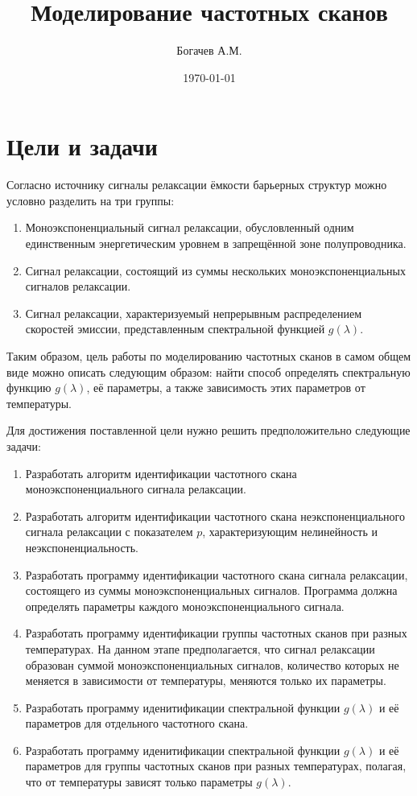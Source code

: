 \documentclass{report}
\title{Моделирование частотных сканов}
\author{Богачев А.М.}
\date{\today}
\begin{document}
    \maketitle


    \chapter{Цели и задачи}

    Согласно источнику \cite{istratov_exp_analysis} сигналы релаксации ёмкости 
    барьерных структур можно условно разделить на три группы:
    \begin{enumerate}
        \item Моноэкспоненциальный сигнал релаксации, обусловленный одним единственным 
        энергетическим уровнем в запрещённой зоне полупроводника.
        \item Сигнал релаксации, состоящий из суммы нескольких моноэкспоненциальных 
        сигналов релаксации.
        \item Сигнал релаксации, характеризуемый непрерывным распределением скоростей 
        эмиссии, представленным спектральной функцией $g(\lambda)$.
    \end{enumerate}

    Таким образом, цель работы по моделированию частотных сканов в самом общем виде 
    можно описать следующим образом: найти способ определять спектральную функцию 
    $g(\lambda)$, её параметры, а также зависимость этих параметров от температуры.

    Для достижения поставленной цели нужно решить предположительно следующие задачи:
    \begin{enumerate}
        \item Разработать алгоритм идентификации частотного скана 
        моноэкспоненциального сигнала релаксации.
        \item Разработать алгоритм идентификации частотного скана 
        неэкспоненциального сигнала релаксации с показателем $p$, 
        характеризующим нелинейность и неэкспоненциальность.
        \item Разработать программу идентификации частотного 
        скана сигнала релаксации, состоящего из суммы моноэкспоненциальных 
        сигналов. Программа должна определять параметры каждого 
        моноэкспоненциального сигнала.
        \item Разработать программу идентификации группы частотных сканов 
        при разных температурах. На данном этапе предполагается, что сигнал 
        релаксации образован суммой моноэкспоненциальных сигналов, 
        количество которых не меняется в зависимости от температуры, 
        меняются только их параметры.
        \item Разработать программу иденитификации спектральной 
        функции $g(\lambda)$ и её параметров для отдельного 
        частотного скана.
        \item Разработать программу иденитификации спектральной 
        функции $g(\lambda)$ и её параметров для группы частотных сканов при 
        разных температурах, полагая, что от температуры зависят только 
        параметры $g(\lambda)$.
    \end{enumerate}
\end{document}
